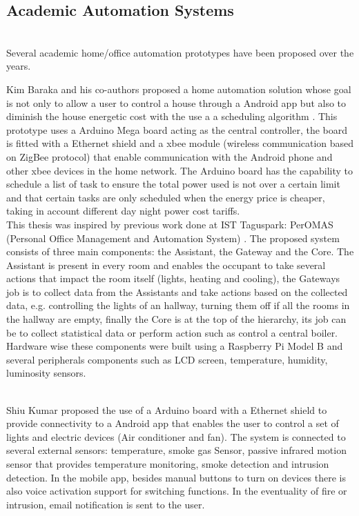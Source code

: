 \subsection{Academic Automation Systems}\mbox{}\\

Several academic home/office automation prototypes have been proposed over the years.

Kim Baraka and his co-authors proposed a home automation solution whose goal is not only to allow a user to control a house through a Android app but also to diminish the house energetic cost with the use a a scheduling algorithm \cite{academic:arduino1}. This prototype uses a Arduino Mega board acting as the central controller, the board is fitted with a Ethernet shield and a xbee module (wireless communication based on ZigBee protocol) that enable communication with the Android phone and other xbee devices in the home network. The Arduino board has the capability to schedule a list of task to ensure the total power used is not over a certain limit and that certain tasks are only scheduled when the energy price is cheaper, taking in account different day night power cost tariffs.
\mbox{}\\

This thesis was inspired by previous work done at IST Taguspark: PerOMAS (Personal Office Management and Automation System) \cite{peromas}. The proposed system consists of three main components: the Assistant, the Gateway and the Core.  The Assistant is present in every room and enables the occupant to take several actions that impact the room itself (lights, heating and cooling), the Gateways job is to collect data from the Assistants and take actions based on the collected data, e.g. controlling the lights of an hallway, turning them off if all the rooms in the hallway are empty, finally the Core is at the top of the hierarchy, its job can be to collect statistical data or perform action such as control a central boiler. 
Hardware wise these components were built using a Raspberry Pi Model B and several peripherals components such as LCD screen, temperature, humidity, luminosity sensors.

\mbox{}\\
Shiu Kumar proposed the use of a Arduino board with a Ethernet shield to provide connectivity to a Android app that enables the user to control a set of lights and electric devices (Air conditioner and fan)\cite{academic3}. The system is connected to several external sensors: temperature, smoke gas Sensor, passive infrared motion sensor that provides temperature monitoring, smoke detection and intrusion detection.
In the mobile app, besides manual buttons to turn on devices there is also voice activation support for switching functions. In the eventuality of fire or intrusion, email notification is sent to the user.



